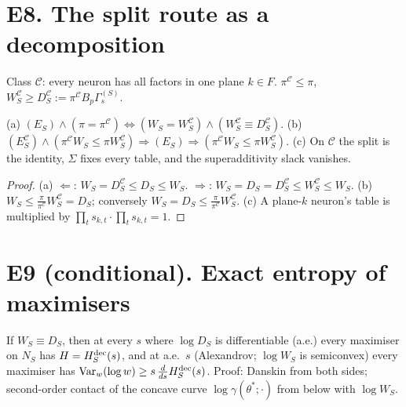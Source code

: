 \documentclass[11pt]{article}
\theoremstyle{remark}\newtheorem{remark}[theorem]{Remark}
\begin{document}
\section{E8. The split route as a decomposition}
Class $\mathcal C$: every neuron has all factors in one plane $k\in F$. $\pi^{\mathcal C}\le\pi$, $W^{\mathcal C}_S\ge D^{\mathcal C}_S:=\pi^{\mathcal C}B_p\Gamma^{(S)}_s$.
\begin{proposition}\label{p:dec}
(a) $(E_S)\wedge(\pi=\pi^{\mathcal C})\iff(W_S=W^{\mathcal C}_S)\wedge(W^{\mathcal C}_S\equiv D^{\mathcal C}_S)$.
(b) $(E^{\mathcal C}_S)\wedge(\pi^{\mathcal C}W_S\le\pi W^{\mathcal C}_S)\Rightarrow(E_S)\Rightarrow(\pi^{\mathcal C}W_S\le\pi W^{\mathcal C}_S)$.
(c) On $\mathcal C$ the split is the identity, $\Sigma$ fixes every table, and the superadditivity slack vanishes.
\end{proposition}
\begin{proof}
(a) $\Leftarrow$: $W_S=D^{\mathcal C}_S\le D_S\le W_S$. $\Rightarrow$: $W_S=D_S=D^{\mathcal C}_S\le W^{\mathcal C}_S\le W_S$.
(b) $W_S\le\frac\pi{\pi^{\mathcal C}}W^{\mathcal C}_S=D_S$; conversely $W_S=D_S\le\frac\pi{\pi^{\mathcal C}}W^{\mathcal C}_S$.
(c) A plane-$k$ neuron's table is multiplied by $\prod_ts_{k,t}\cdot\prod_ts_{k,t}=1$.
\end{proof}

\section{E9 (conditional). Exact entropy of maximisers}
If $W_S\equiv D_S$, then at every $s$ where $\log D_S$ is differentiable (a.e.) every maximiser on $N_S$ has $H=H^{\rm dec}_S(s)$, and at a.e.\ $s$
(Alexandrov; $\log W_S$ is semiconvex) every maximiser has $\mathrm{Var}_w(\log w)\ge s\,\frac{d}{ds}H^{\rm dec}_S(s)$.
Proof: Danskin from both sides; second-order contact of the concave curve $\log\gamma(\theta^*;\cdot)$ from below with $\log W_S$.
\end{document}
